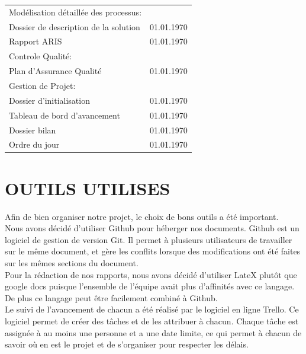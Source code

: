 \documentclass[]{scrartcl}
\begin{document}
\begin{table}[h!]
\begin{tabular}{l r}
         \hspace{0.33cm}   Modélisation détaillée des processus: &\\
                \hspace{0.66cm}  Dossier de description de la solution&01.01.1970\\ 
       \hspace{0.66cm}  Rapport ARIS & 01.01.1970\\
         \hspace{0.33cm}   Controle Qualité: & \\
                \hspace{0.66cm} Plan d'Assurance Qualité & 01.01.1970\\ 
                \midrule
                Gestion de Projet: &\\
                \midrule
			\hspace{0.33cm}   Dossier d'initialisation & 01.01.1970\\
			\hspace{0.33cm}   Tableau de bord d'avancement & 01.01.1970\\
			\hspace{0.33cm}   Dossier bilan & 01.01.1970\\
			\hspace{0.33cm}   Ordre du jour  & 01.01.1970\\
        \midrule%
        \bottomrule%
   \end{tabular}%
   \label{tab:sample_label}%
   \end{table}




\section{OUTILS UTILISES}
Afin de bien organiser notre projet, le choix de bons outils a été important. \\
Nous avons décidé d'utiliser Github pour héberger nos documents. Github est un logiciel de gestion de version Git. Il permet à plusieurs utilisateurs de travailler sur le même document, et gère les conflits lorsque des modifications ont été faites sur les mêmes sections du document. \\
Pour la rédaction de nos rapports, nous avons décidé d'utiliser LateX plutôt que google docs puisque l'ensemble de l'équipe avait plus d'affinités avec ce langage. De plus ce langage peut être facilement combiné à Github. \\
Le suivi de l'avancement de chacun a été réalisé par le logiciel en ligne Trello. Ce logiciel permet de créer des tâches et de les attribuer à chacun. Chaque tâche est assignée à au moins une personne et a une date limite, ce qui permet à chacun de savoir où en est le projet et de s'organiser pour respecter les délais. \\
\end{document}

